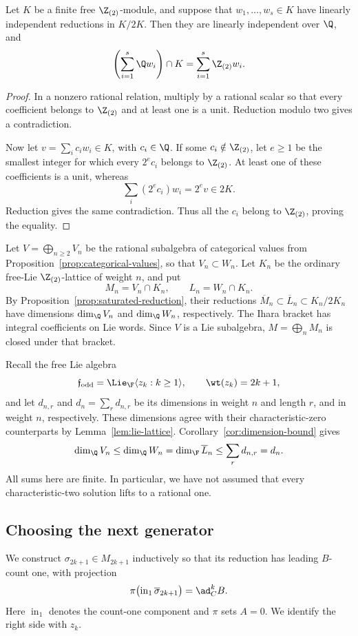 \begin{lemma}\label{lem:hall-saturation}
Let \(K\) be a finite free \(\Z_{(2)}\)-module, and suppose that
\(w_1,\ldots,w_s\in K\) have linearly independent reductions in
\(K/2K\).  Then they are linearly independent over \(\Q\), and
\[
 \left(\sum_{i=1}^s\Q w_i\right)\cap K
   =\sum_{i=1}^s\Z_{(2)}w_i.
\]
\end{lemma}
\begin{proof}
In a nonzero rational relation, multiply by a rational scalar so
that every coefficient belongs to \(\Z_{(2)}\) and at least one is
a unit.  Reduction modulo two gives a contradiction.

Now let \(v=\sum_i c_iw_i\in K\), with \(c_i\in\Q\).
If some \(c_i\notin\Z_{(2)}\), let \(e\ge1\) be the smallest integer
for which every \(2^ec_i\) belongs to \(\Z_{(2)}\).
At least one of these coefficients is a unit, whereas
\[
 \sum_i(2^ec_i)w_i=2^ev\in2K.
\]
Reduction gives the same contradiction.  Thus all the \(c_i\)
belong to \(\Z_{(2)}\), proving the equality.
\end{proof}

Let \(V=\bigoplus_{n\ge2}V_n\) be the rational subalgebra of
categorical values from Proposition~\ref{prop:categorical-values},
so that \(V_n\subset W_n\).
Let \(K_n\) be the ordinary free-Lie \(\Z_{(2)}\)-lattice of
weight \(n\), and put
\[
 M_n=V_n\cap K_n,\qquad L_n=W_n\cap K_n.
\]
By Proposition~\ref{prop:saturated-reduction}, their reductions
\(\overline M_n\subset\overline L_n\subset K_n/2K_n\) have
dimensions \(\dim_\Q V_n\) and \(\dim_\Q W_n\), respectively.
The Ihara bracket has integral coefficients on Lie words.
Since \(V\) is a Lie subalgebra, \(M=\bigoplus_n M_n\) is closed
under that bracket.

Recall the free Lie algebra
\[
 \mathfrak f_{\mathrm{odd}}
   =\Lie_{\F}\langle z_k:k\ge1\rangle,\qquad
 \wt(z_k)=2k+1,
\]
and let \(d_{n,r}\) and \(d_n=\sum_r d_{n,r}\) be its dimensions
in weight \(n\) and length \(r\), and in weight \(n\), respectively.
These dimensions agree with their characteristic-zero counterparts
by Lemma~\ref{lem:lie-lattice}.
Corollary~\ref{cor:dimension-bound} gives
\begin{equation}\label{eq:dimension-squeeze}
 \dim_\Q V_n
 \le \dim_\Q W_n
 =\dim_\F\overline L_n
 \le\sum_r d_{n,r}=d_n.
\end{equation}
All sums here are finite.  In particular, we have not assumed
that every characteristic-two solution lifts to a rational one.

\subsection{Choosing the next generator}
We construct \(\sigma_{2k+1}\in M_{2k+1}\) inductively so that
its reduction has leading \(B\)-count one, with projection
\begin{equation}\label{eq:generator-leading-term}
 \pi\bigl(\operatorname{in}_1\overline\sigma_{2k+1}\bigr)
       =\ad_C^kB.
\end{equation}
Here \(\operatorname{in}_1\) denotes the count-one component and
\(\pi\) sets \(A=0\).  We identify the right side with \(z_k\).

